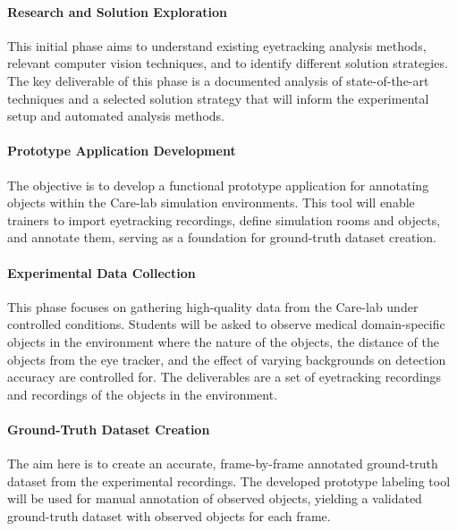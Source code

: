 \documentclass[english]{hogent-article}
\begin{document}
\paragraph{Research and Solution Exploration\\}
This initial phase aims to understand existing eyetracking analysis methods, 
relevant computer vision techniques, and to identify different solution strategies. 
The key deliverable of this phase is a documented analysis of state-of-the-art techniques and a selected solution strategy 
that will inform the experimental setup and automated analysis methods.

\paragraph{Prototype Application Development\\}
The objective is to develop a functional prototype application for annotating objects within the Care-lab simulation environments.
This tool will enable trainers to import eyetracking recordings, define simulation rooms and objects, and annotate them, 
serving as a foundation for ground-truth dataset creation.

\paragraph{Experimental Data Collection\\}
This phase focuses on gathering high-quality data from the Care-lab under controlled conditions. 
Students will be asked to observe medical domain-specific objects in the environment where the nature of the objects, 
the distance of the objects from the eye tracker, and the effect of varying backgrounds on detection accuracy are controlled for.
The deliverables are a set of eyetracking recordings and recordings of the objects in the environment.

\paragraph{Ground-Truth Dataset Creation\\}
The aim here is to create an accurate, frame-by-frame annotated ground-truth dataset from the experimental recordings. 
The developed prototype labeling tool will be used for manual annotation of observed objects, 
yielding a validated ground-truth dataset with observed objects for each frame.
\end{document}

